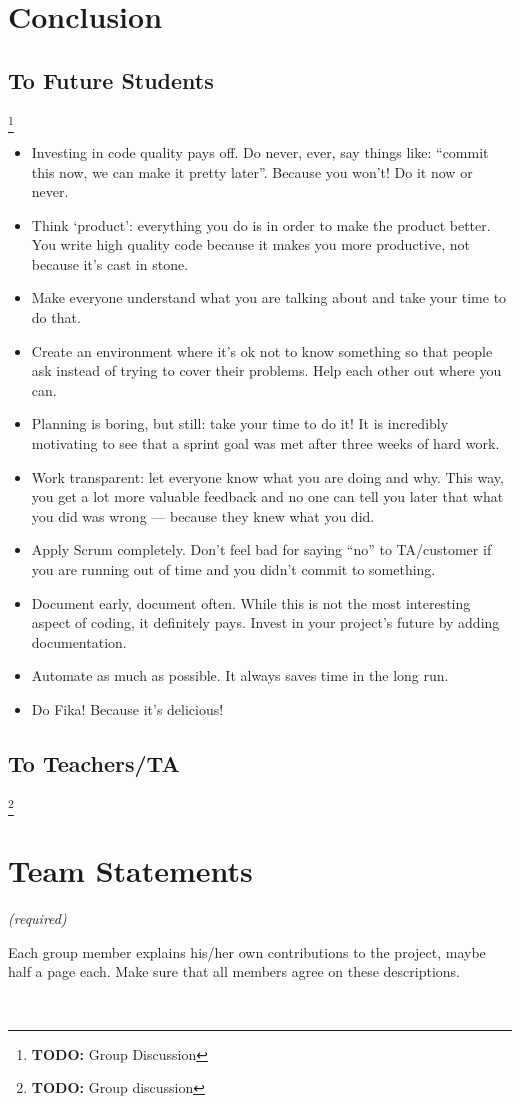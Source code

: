 \documentclass[11pt,a4paper]{report}
\newcommand{\hi}[1]{{\color{red}\tiny \em #1\/}\\}
\newcommand{\todo}[1]{\footnote{{\color{red} {\bf TODO:} #1}}}
\begin{document}
\chapter{Conclusion}
\section*{To Future Students}
\todo{Group Discussion}
\begin{itemize}
\item  Investing in code quality pays off. Do never, ever, say things like:
``commit this now, we can make it pretty later''. Because you won't!
Do it now or never.
\item Think `product': everything you do is in order to make the product better.
You write high quality code because it makes you more productive, not because
it's cast in stone.
\item Make everyone understand what you are talking about and take your time to
do that.
\item Create an environment where it's ok not to know something so that people
ask instead of trying to cover their problems. Help each other out where you
can.
\item Planning is boring, but still: take your time to do it! It is incredibly
motivating to see that a sprint goal was met after three weeks of hard work.
\item Work transparent: let everyone know what you are doing and why. This way,
you get a lot more valuable feedback and no one can tell you later that what you
did was wrong --- because they knew what you did.
\item Apply Scrum completely. Don't feel bad for saying ``no'' to TA/customer if
you are running out of time and you didn't commit to something.
\item Document early, document often. While this is not the most interesting aspect
of coding, it definitely pays. Invest in your project's future by adding documentation.
\item Automate as much as possible. It always saves time in the long run.
\item Do Fika! Because it's delicious!
\end{itemize}
\section*{To Teachers/TA}
\todo{Group discussion}

\appendix

\chapter{Team Statements}
\hi{ (required)

Each group member explains his/her own contributions to the project, maybe half a page each. Make sure that all members agree on these descriptions.}
\end{document}
